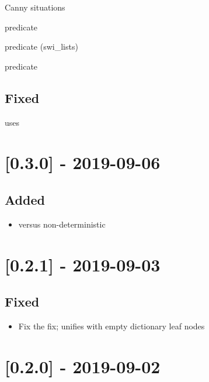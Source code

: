 \begin{shortlist}
    \item Canny situations
    \item {} predicate
    \item {} predicate (swi_lists)
    \item {} predicate
\end{shortlist}

\subsection{Fixed}

\begin{shortlist}
    \item {} uses 
\end{shortlist}

\section{[0.3.0] - 2019-09-06}

\subsection{Added}

\begin{itemize}
    \item {} versus non-deterministic 
\end{itemize}

\section{[0.2.1] - 2019-09-03}

\subsection{Fixed}

\begin{itemize}
    \item Fix the fix;  unifies with empty dictionary leaf nodes
\end{itemize}

\section{[0.2.0] - 2019-09-02}

